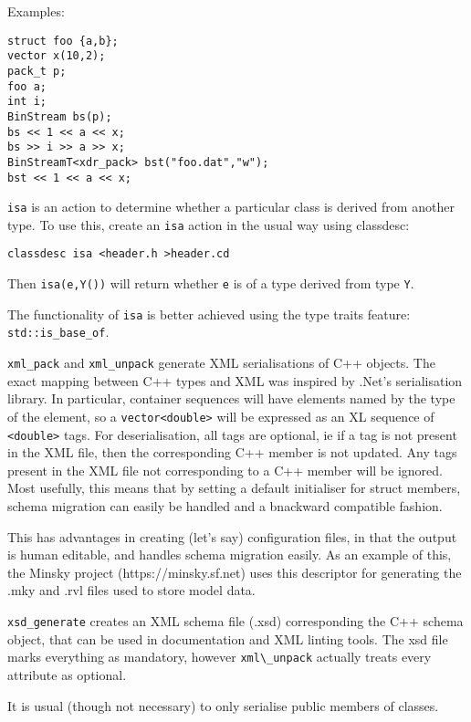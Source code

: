 Examples:
\begin{verbatim}
struct foo {a,b};
vector x(10,2);
pack_t p;
foo a; 
int i;
BinStream bs(p);
bs << 1 << a << x;
bs >> i >> a >> x;
BinStreamT<xdr_pack> bst("foo.dat","w");
bst << 1 << a << x;
\end{verbatim}


\verb+isa+ is an action to determine whether a particular class is
derived from another type. To use this, create an \verb+isa+ action in
the usual way using classdesc:
\begin{verbatim}
classdesc isa <header.h >header.cd
\end{verbatim}
Then \verb+isa(e,Y())+ will return whether \verb+e+ is of a type
derived from type \verb+Y+.

The functionality of \verb+isa+ is better achieved using the type
traits feature: \verb+std::is_base_of+.



\verb+xml_pack+ and \verb+xml_unpack+ generate XML serialisations of
C++ objects. The exact mapping between C++ types and XML was inspired
by .Net's serialisation library. In particular, container sequences
will have elements named by the type of the element, so a
\verb+vector<double>+ will be expressed as an XL sequence of
\verb+<double>+ tags. For deserialisation, all tags are optional, ie
if a tag is not present in the XML file, then the corresponding C++
member is not updated. Any tags present in the XML file not
corresponding to a C++ member will be ignored. Most usefully, this
means that by setting a default initialiser for struct members, schema
migration can easily be handled and a bnackward compatible fashion.

This has advantages in creating (let's say) configuration
files, in that the output is human editable, and handles schema
migration easily. As an example of this, the Minsky project
(https://minsky.sf.net) uses this descriptor for generating the .mky
and .rvl files used to store model data.

\verb+xsd_generate+ creates an XML schema file (.xsd) corresponding
the C++ schema object, that can be used in documentation and XML
linting tools. The xsd file marks everything as mandatory, however
\verb+xml\_unpack+ actually treats every attribute as optional.

It is usual (though not necessary) to only serialise public members of classes.

